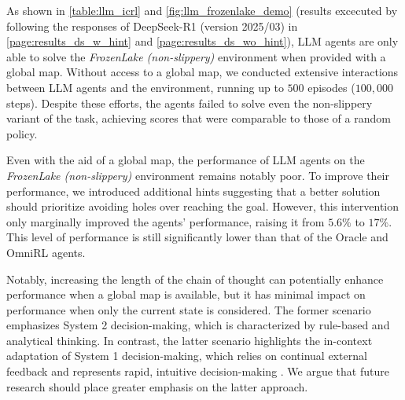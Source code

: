 \documentclass{article}
\renewcommand{\cite}[1]{\citep{#1}}
\begin{document}
As shown in \cref{table:llm_icrl} and \cref{fig:llm_frozenlake_demo} (results excecuted by following the responses of DeepSeek-R1 (version 2025/03) in \cref{page:results_ds_w_hint} and \cref{page:results_ds_wo_hint}), LLM agents are only able to solve the \emph{FrozenLake (non-slippery)} environment when provided with a global map. Without access to a global map, we conducted extensive interactions between LLM agents and the environment, running up to $500$ episodes ($100,000$ steps). Despite these efforts, the agents failed to solve even the non-slippery variant of the task, achieving scores that were comparable to those of a random policy.

Even with the aid of a global map, the performance of LLM agents on the \emph{FrozenLake (non-slippery)} environment remains notably poor. To improve their performance, we introduced additional hints suggesting that a better solution should prioritize avoiding holes over reaching the goal. However, this intervention only marginally improved the agents' performance, raising it from $5.6\%$ to $17\%$. This level of performance is still significantly lower than that of the Oracle and OmniRL agents.

Notably, increasing the length of the chain of thought can potentially enhance performance when a global map is available, but it has minimal impact on performance when only the current state is considered. The former scenario emphasizes System 2 decision-making, which is characterized by rule-based and analytical thinking. In contrast, the latter scenario highlights the in-context adaptation of System 1 decision-making, which relies on continual external feedback and represents rapid, intuitive decision-making \cite{wason1974dual,kahneman2011thinking}. We argue that future research should place greater emphasis on the latter approach.
\end{document}
